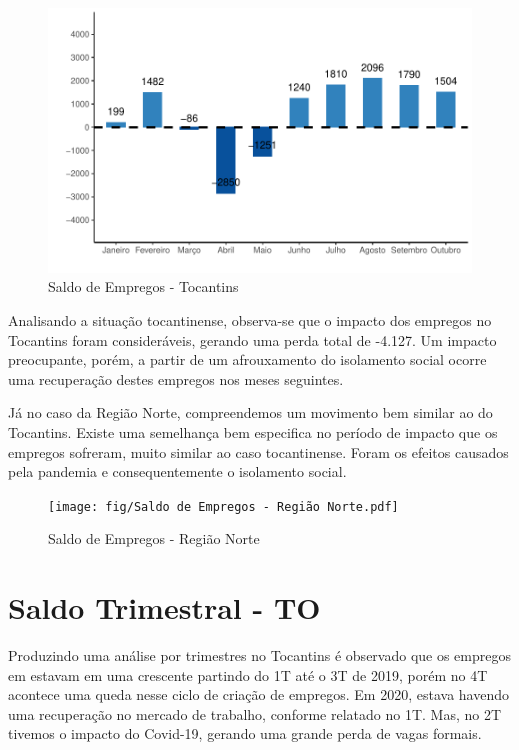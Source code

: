 \begin{figure}[h]
	\caption{Saldo de Empregos - Tocantins}
	\includegraphics[width=\linewidth]{fig/Saldo de empregos - Tocantins.pdf}
\end{figure}

\par Analisando a situação tocantinense, observa-se que o impacto dos
empregos no Tocantins foram consideráveis, gerando uma perda total de -4.127. Um impacto preocupante, porém, a partir de um afrouxamento do isolamento social ocorre uma recuperação destes empregos nos meses seguintes.

\par Já no caso da Região Norte, compreendemos um movimento bem similar ao do Tocantins. Existe uma semelhança bem especifica no período de impacto que os empregos sofreram, muito similar ao caso tocantinense. Foram os efeitos causados pela pandemia e consequentemente o isolamento social.

\begin{figure}[h]
	\caption{Saldo de Empregos - Região Norte}
	\texttt{[image: fig/Saldo de Empregos - Região Norte.pdf]}
\end{figure}
\newpage
\section{Saldo Trimestral - TO}
\par Produzindo uma análise por trimestres no Tocantins é observado que os empregos em estavam em uma crescente partindo do 1T até o 3T de 2019, porém no 4T acontece uma queda nesse ciclo de criação de empregos. Em 2020, estava havendo uma recuperação no mercado de trabalho, conforme relatado no 1T. Mas, no 2T tivemos o impacto do Covid-19, gerando uma grande perda de vagas formais.


